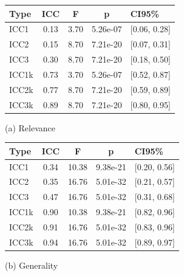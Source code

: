 \begin{figure}[h]
    \centering
    \begin{minipage}{.5\textwidth}
        \centering
        \begin{tabular}{lcccl}
            \hline
            \textbf{Type} & \textbf{ICC} & \textbf{F} & \textbf{p} & \textbf{CI95\%} \\
            \hline
            ICC1          & 0.13         & 3.70       & 5.26e-07   & [0.06, 0.28]    \\
            ICC2          & 0.15         & 8.70       & 7.21e-20   & [0.07, 0.31]    \\
            ICC3          & 0.30         & 8.70       & 7.21e-20   & [0.18, 0.50]    \\
            ICC1k         & 0.73         & 3.70       & 5.26e-07   & [0.52, 0.87]    \\
            ICC2k         & 0.77         & 8.70       & 7.21e-20   & [0.59, 0.89]    \\
            ICC3k         & 0.89         & 8.70       & 7.21e-20   & [0.80, 0.95]    \\
            \hline
        \end{tabular}
        \caption*{(a) Relevance}
    \end{minipage}%
    \begin{minipage}{.5\textwidth}
        \centering
        \begin{tabular}{lcccl}
            \hline
            \textbf{Type} & \textbf{ICC} & \textbf{F} & \textbf{p} & \textbf{CI95\%} \\
            \hline
            ICC1          & 0.34         & 10.38      & 9.38e-21   & [0.20, 0.56]    \\
            ICC2          & 0.35         & 16.76      & 5.01e-32   & [0.21, 0.57]    \\
            ICC3          & 0.47         & 16.76      & 5.01e-32   & [0.31, 0.68]    \\
            ICC1k         & 0.90         & 10.38      & 9.38e-21   & [0.82, 0.96]    \\
            ICC2k         & 0.91         & 16.76      & 5.01e-32   & [0.83, 0.96]    \\
            ICC3k         & 0.94         & 16.76      & 5.01e-32   & [0.89, 0.97]    \\
            \hline
        \end{tabular}
        \caption*{(b) Generality}
    \end{minipage}


\end{figure}
